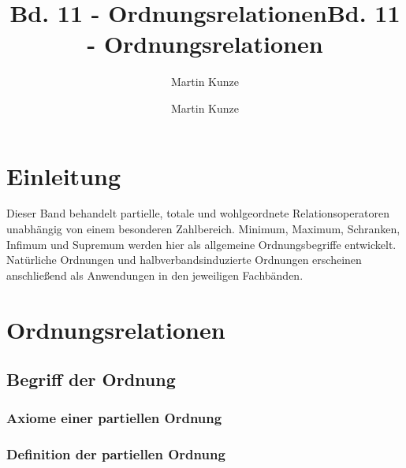 \documentclass[main.tex]{subfiles}
\title{Bd. 11 - Ordnungsrelationen}
\author{Martin Kunze}
\date{}
\begin{document}
\title{Bd. 11 - Ordnungsrelationen}
\author{Martin Kunze}
\date{}
\hypersetup{pageanchor=false}
\maketitle
\hypersetup{pageanchor=true}
\setcounter{tocdepth}{3}
\tableofcontents
\setcounter{file}{11}
\renewcommand{\FormulaBandID}{11}
\providecommand{\ProofRefStack}[1]{%
  \ensuremath{\begin{gathered}#1\end{gathered}}}

\chapter{Einleitung}

Dieser Band behandelt partielle, totale und wohlgeordnete Relationsoperatoren
unabhängig von einem besonderen Zahlbereich. Minimum, Maximum, Schranken,
Infimum und Supremum werden hier als allgemeine Ordnungsbegriffe entwickelt.
Natürliche Ordnungen und halbverbandsinduzierte Ordnungen erscheinen
anschließend als Anwendungen in den jeweiligen Fachbänden.

\chapter{Ordnungsrelationen}

\section{Begriff der Ordnung}

\subsection{Axiome einer partiellen Ordnung}


\subsection{Definition der partiellen Ordnung}

\end{document}
